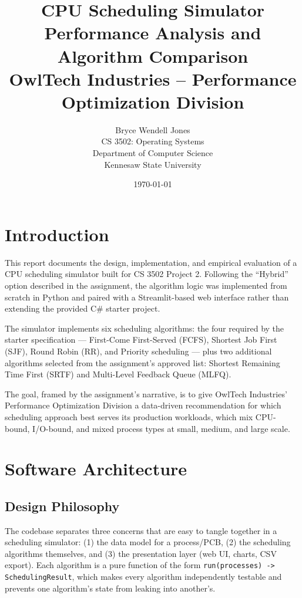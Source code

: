 \documentclass[11pt]{article}
\title{\vspace{-1.5cm}\textbf{CPU Scheduling Simulator} \\ \large Performance Analysis and Algorithm Comparison \\ \normalsize OwlTech Industries -- Performance Optimization Division}
\author{Bryce Wendell Jones \\ CS 3502: Operating Systems \\ Department of Computer Science \\ Kennesaw State University}
\date{\today}
\begin{document}
\maketitle
\thispagestyle{empty}
\newpage

\tableofcontents
\newpage

\section{Introduction}

This report documents the design, implementation, and empirical evaluation
of a CPU scheduling simulator built for CS 3502 Project 2. Following the
``Hybrid'' option described in the assignment, the algorithm logic was
implemented from scratch in Python and paired with a Streamlit-based web
interface rather than extending the provided C\# starter project.

The simulator implements six scheduling algorithms: the four required by
the starter specification --- First-Come First-Served (FCFS), Shortest Job
First (SJF), Round Robin (RR), and Priority scheduling --- plus two
additional algorithms selected from the assignment's approved list:
Shortest Remaining Time First (SRTF) and Multi-Level Feedback Queue (MLFQ).

The goal, framed by the assignment's narrative, is to give OwlTech
Industries' Performance Optimization Division a data-driven recommendation
for which scheduling approach best serves its production workloads, which
mix CPU-bound, I/O-bound, and mixed process types at small, medium, and
large scale.

\section{Software Architecture}

\subsection{Design Philosophy}

The codebase separates three concerns that are easy to tangle together in a
scheduling simulator: (1) the data model for a process/PCB, (2) the
scheduling algorithms themselves, and (3) the presentation layer (web UI,
charts, CSV export). Each algorithm is a pure function of the form
\texttt{run(processes) -> SchedulingResult}, which makes every algorithm
independently testable and prevents one algorithm's state from leaking into
another's.
\end{document}
